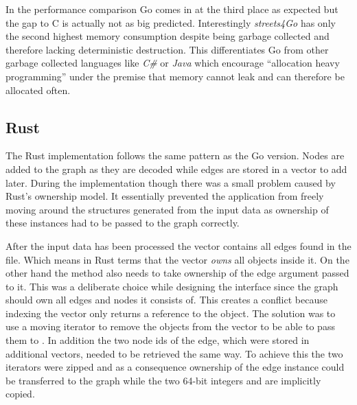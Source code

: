 In the performance comparison Go comes in at the third place as expected but the gap to C is actually not as big predicted. Interestingly \textit{streets4Go} has only the second highest memory consumption despite being garbage collected and therefore lacking deterministic destruction. This differentiates Go from other garbage collected languages like \textit{C\#} or \textit{Java} which encourage ``allocation heavy programming'' under the premise that memory cannot leak and can therefore be allocated often.

\subsection{Rust}
\label{subsec:Implementation::SequentialBenchmark::Rust}

The Rust implementation follows the same pattern as the Go version. Nodes are added to the graph as they are decoded while edges are stored in a vector to add later. During the implementation though there was a small problem caused by Rust's ownership model. It essentially prevented the application from freely moving around the structures generated from the input data as ownership of these instances had to be passed to the graph correctly.

After the input data has been processed the  vector contains all edges found in the file. Which means in Rust terms that the vector \textit{owns} all objects inside it. On the other hand the  method also needs to take ownership of the edge argument passed to it. This was a deliberate choice while designing the interface since the graph should own all edges and nodes it consists of. This creates a conflict because indexing the vector only returns a reference to the object. The solution was to use a moving iterator to remove the objects from the vector to be able to pass them to . In addition the two node ids of the edge, which were stored in additional vectors, needed to be retrieved the same way. To achieve this the two iterators were zipped and as a consequence ownership of the edge instance could be transferred to the graph while the two 64-bit integers  and  are implicitly copied.
\\


